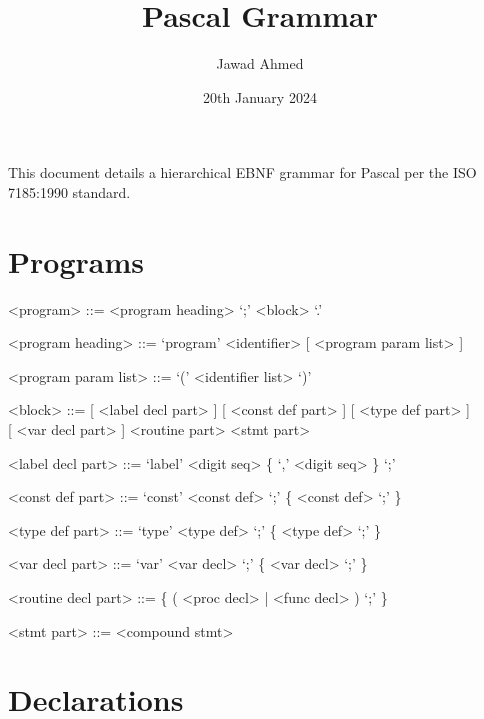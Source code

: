 \documentclass{article}
\title{Pascal Grammar}
\author{Jawad Ahmed}
\date{20th January 2024}
\begin{document}
\maketitle
\setcounter{section}{-1}

This document details a hierarchical EBNF grammar for Pascal per the ISO 7185:1990 standard.

\section{Programs}

{
  \begin{grammar}
    <program> ::= <program heading> `;' <block> `.'

    <program heading> ::= `program' <identifier> [ <program param list> ]

    <program param list> ::= `(' <identifier list> `)'
    
    <block> ::= [ <label decl part> ]  [ <const def part> ] [ <type def part> ] \\
    \hphantom{} [ <var decl part> ] <routine part> <stmt part>

    <label decl part> ::= `label' <digit seq> \{ `,' <digit seq> \} `;'

    <const def part> ::= `const' <const def> `;' \{ <const def> `;' \}

    <type def part> ::= `type' <type def> `;' \{ <type def> `;' \}

    <var decl part> ::= `var' <var decl> `;' \{ <var decl> `;' \}

    <routine decl part> ::= \{ ( <proc decl> | <func decl> ) `;' \}

    <stmt part> ::= <compound stmt>
  \end{grammar}
}

\section{Declarations}
\end{document}
